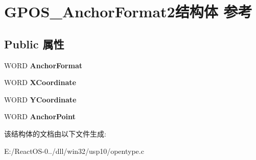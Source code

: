 \hypertarget{struct_g_p_o_s___anchor_format2}{}\section{G\+P\+O\+S\+\_\+\+Anchor\+Format2结构体 参考}
\label{struct_g_p_o_s___anchor_format2}
\subsection*{Public 属性}
\begin{DoxyCompactItemize}
\item 
\mbox{\label{struct_g_p_o_s___anchor_format2_a28e2df79d859a94a2b70f865759280cf}} 
W\+O\+RD {\bfseries Anchor\+Format}
\item 
\mbox{\label{struct_g_p_o_s___anchor_format2_a36793bdf25a087146e2293e2c0980978}} 
W\+O\+RD {\bfseries X\+Coordinate}
\item 
\mbox{\label{struct_g_p_o_s___anchor_format2_a77e0eebc89bf77c66bd545a484f161cd}} 
W\+O\+RD {\bfseries Y\+Coordinate}
\item 
\mbox{\label{struct_g_p_o_s___anchor_format2_a52ca01bcfa1feb63567040c40955eedb}} 
W\+O\+RD {\bfseries Anchor\+Point}
\end{DoxyCompactItemize}


该结构体的文档由以下文件生成\+:\begin{DoxyCompactItemize}
\item 
E\+:/\+React\+O\+S-\/0../dll/win32/usp10/opentype.\+c\end{DoxyCompactItemize}
